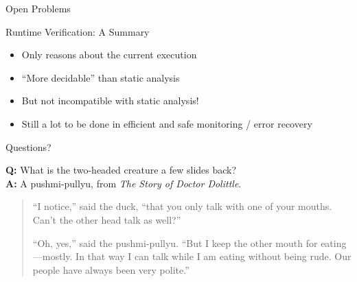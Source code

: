 \documentclass[12pt]{beamer}
\begin{document}
\begin{frame}{Open Problems}
  
\end{frame}

\begin{frame}{Runtime Verification: \small A Summary}
  \begin{itemize}
    \item<1-> Only reasons about the current execution
    \item<1-> ``More decidable'' than static analysis
    \item<2-> But not incompatible with static analysis!
    \item<3-> Still a lot to be done in efficient and safe monitoring
      / error recovery
  \end{itemize}
\end{frame}

\begin{frame}{Questions?}
  \vspace{4.5cm}

  \footnotesize
  \textbf{Q:} What is the two-headed creature a few slides back?\\
  \textbf{A:} A pushmi-pullyu, from \textit{The Story of Doctor Dolittle}.

  \begin{quote}
    ``I notice,'' said the duck, ``that you only talk with one of your
    mouths. Can't the other head talk as well?''

    ``Oh, yes,'' said the pushmi-pullyu. ``But I keep the other mouth
    for eating---mostly. In that way I can talk while I am eating
    without being rude. Our people have always been very polite.''
  \end{quote}
\end{frame}
\end{document}
